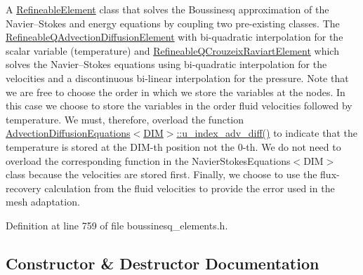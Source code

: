A \hyperlink{classoomph_1_1RefineableElement}{Refineable\+Element} class that solves the Boussinesq approximation of the Navier--Stokes and energy equations by coupling two pre-\/existing classes. The \hyperlink{classoomph_1_1RefineableQAdvectionDiffusionElement}{Refineable\+Q\+Advection\+Diffusion\+Element} with bi-\/quadratic interpolation for the scalar variable (temperature) and \hyperlink{classoomph_1_1RefineableQCrouzeixRaviartElement}{Refineable\+Q\+Crouzeix\+Raviart\+Element} which solves the Navier--Stokes equations using bi-\/quadratic interpolation for the velocities and a discontinuous bi-\/linear interpolation for the pressure. Note that we are free to choose the order in which we store the variables at the nodes. In this case we choose to store the variables in the order fluid velocities followed by temperature. We must, therefore, overload the function \hyperlink{classoomph_1_1AdvectionDiffusionEquations_aadffa26c42be5d4a1156a7467de48fb8}{Advection\+Diffusion\+Equations$<$\+D\+I\+M$>$\+::u\+\_\+index\+\_\+adv\+\_\+diff()} to indicate that the temperature is stored at the D\+I\+M-\/th position not the 0-\/th. We do not need to overload the corresponding function in the Navier\+Stokes\+Equations$<$\+D\+I\+M$>$ class because the velocities are stored first. Finally, we choose to use the flux-\/recovery calculation from the fluid velocities to provide the error used in the mesh adaptation. 

Definition at line 759 of file boussinesq\+\_\+elements.\+h.



\subsection{Constructor \& Destructor Documentation}
\mbox{\label{classoomph_1_1RefineableBuoyantQCrouzeixRaviartElement_a180c3373158434bc08fc69cc0f4392f9}} 
